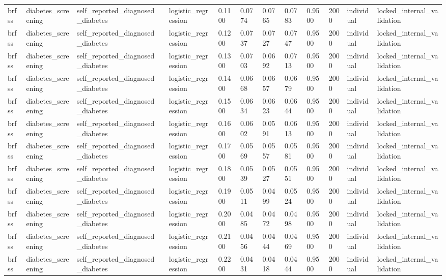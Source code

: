 \begin{tabular}{lllllllllllll}
brfss & diabetes\_screening & self\_reported\_diagnosed\_diabetes &  & logistic\_regression & 0.1100 & 0.0774 & 0.0765 & 0.0783 & 0.9500 & 2000 & individual & locked\_internal\_validation \\
brfss & diabetes\_screening & self\_reported\_diagnosed\_diabetes &  & logistic\_regression & 0.1200 & 0.0737 & 0.0727 & 0.0747 & 0.9500 & 2000 & individual & locked\_internal\_validation \\
brfss & diabetes\_screening & self\_reported\_diagnosed\_diabetes &  & logistic\_regression & 0.1300 & 0.0703 & 0.0692 & 0.0713 & 0.9500 & 2000 & individual & locked\_internal\_validation \\
brfss & diabetes\_screening & self\_reported\_diagnosed\_diabetes &  & logistic\_regression & 0.1400 & 0.0668 & 0.0657 & 0.0679 & 0.9500 & 2000 & individual & locked\_internal\_validation \\
brfss & diabetes\_screening & self\_reported\_diagnosed\_diabetes &  & logistic\_regression & 0.1500 & 0.0634 & 0.0623 & 0.0644 & 0.9500 & 2000 & individual & locked\_internal\_validation \\
brfss & diabetes\_screening & self\_reported\_diagnosed\_diabetes &  & logistic\_regression & 0.1600 & 0.0602 & 0.0591 & 0.0613 & 0.9500 & 2000 & individual & locked\_internal\_validation \\
brfss & diabetes\_screening & self\_reported\_diagnosed\_diabetes &  & logistic\_regression & 0.1700 & 0.0569 & 0.0557 & 0.0581 & 0.9500 & 2000 & individual & locked\_internal\_validation \\
brfss & diabetes\_screening & self\_reported\_diagnosed\_diabetes &  & logistic\_regression & 0.1800 & 0.0539 & 0.0527 & 0.0551 & 0.9500 & 2000 & individual & locked\_internal\_validation \\
brfss & diabetes\_screening & self\_reported\_diagnosed\_diabetes &  & logistic\_regression & 0.1900 & 0.0511 & 0.0499 & 0.0524 & 0.9500 & 2000 & individual & locked\_internal\_validation \\
brfss & diabetes\_screening & self\_reported\_diagnosed\_diabetes &  & logistic\_regression & 0.2000 & 0.0485 & 0.0472 & 0.0498 & 0.9500 & 2000 & individual & locked\_internal\_validation \\
brfss & diabetes\_screening & self\_reported\_diagnosed\_diabetes &  & logistic\_regression & 0.2100 & 0.0456 & 0.0444 & 0.0469 & 0.9500 & 2000 & individual & locked\_internal\_validation \\
brfss & diabetes\_screening & self\_reported\_diagnosed\_diabetes &  & logistic\_regression & 0.2200 & 0.0431 & 0.0418 & 0.0444 & 0.9500 & 2000 & individual & locked\_internal\_validation \\

\end{tabular}
